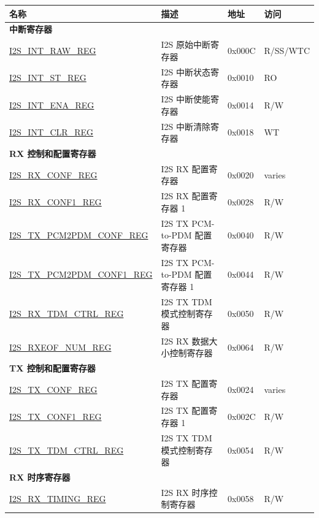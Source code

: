 \begin{longtable}{ | p{6cm} | p{6.2cm} | p{1.3cm} | p{2cm} | }
\hline\rowcolor{lightgray}
\textbf{名称} & \textbf{描述} &  \textbf{地址} & \textbf{访问} \\ \hline
\endhead
\multicolumn{4}{|l|}{\textbf{中断寄存器}} \\ \hline
\hyperref[regdesc:I2SINTRAWREG]{I2S\_INT\_RAW\_REG} & I2S 原始中断寄存器 & 0x000C & R/SS/WTC \\ \hline
\hyperref[regdesc:I2SINTSTREG]{I2S\_INT\_ST\_REG} & I2S 中断状态寄存器 & 0x0010 & RO \\ \hline
\hyperref[regdesc:I2SINTENAREG]{I2S\_INT\_ENA\_REG} & I2S 中断使能寄存器 & 0x0014 & R/W \\ \hline
\hyperref[regdesc:I2SINTCLRREG]{I2S\_INT\_CLR\_REG} & I2S 中断清除寄存器 & 0x0018 & WT \\ \hline
\multicolumn{4}{|l|}{\textbf{RX 控制和配置寄存器}} \\ \hline
\hyperref[regdesc:I2SRXCONFREG]{I2S\_RX\_CONF\_REG} & I2S RX 配置寄存器 & 0x0020 & varies \\ \hline
\hyperref[regdesc:I2SRXCONF1REG]{I2S\_RX\_CONF1\_REG} & I2S RX 配置寄存器 1 & 0x0028 & R/W \\ \hline
\hyperref[regdesc:I2STXPCM2PDMCONFREG]{I2S\_TX\_PCM2PDM\_CONF\_REG} & I2S TX PCM-to-PDM 配置寄存器 & 0x0040 & R/W \\ \hline
\hyperref[regdesc:I2STXPCM2PDMCONF1REG]{I2S\_TX\_PCM2PDM\_CONF1\_REG} & I2S TX PCM-to-PDM 配置寄存器 1 & 0x0044 & R/W \\ \hline
\hyperref[regdesc:I2SRXTDMCTRLREG]{I2S\_RX\_TDM\_CTRL\_REG} & I2S TX TDM 模式控制寄存器 & 0x0050 & R/W \\ \hline
\hyperref[regdesc:I2SRXEOFNUMREG]{I2S\_RXEOF\_NUM\_REG} & I2S RX 数据大小控制寄存器 & 0x0064 & R/W \\ \hline
\multicolumn{4}{|l|}{\textbf{TX 控制和配置寄存器}} \\ \hline
\hyperref[regdesc:I2STXCONFREG]{I2S\_TX\_CONF\_REG} & I2S TX 配置寄存器 & 0x0024 & varies \\ \hline
\hyperref[regdesc:I2STXCONF1REG]{I2S\_TX\_CONF1\_REG} & I2S TX 配置寄存器 1 & 0x002C & R/W \\ \hline
\hyperref[regdesc:I2STXTDMCTRLREG]{I2S\_TX\_TDM\_CTRL\_REG} & I2S TX TDM 模式控制寄存器 & 0x0054 & R/W \\ \hline
\multicolumn{4}{|l|}{\textbf{RX 时序寄存器}} \\ \hline
\hyperref[regdesc:I2SRXTIMINGREG]{I2S\_RX\_TIMING\_REG} & I2S RX 时序控制寄存器 & 0x0058 & R/W \\ \hline

\end{longtable}

